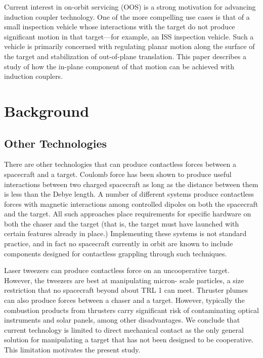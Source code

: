 \documentclass{article}
\begin{document}
Current interest in on-orbit servicing (OOS) is a strong motivation for advancing induction coupler technology. \cite{Ambrose2012}
 One of the more compelling use cases is that of a small inspection vehicle whose interactions with the target do not produce significant motion in that target—for example, an ISS inspection vehicle. Such a vehicle is primarily concerned with regulating planar motion along the surface of the target and stabilization of out-of-plane translation. This paper describes a study of how the in-plane component of that motion can be achieved with induction couplers.


\section{Background}
\subsection{Other Technologies}

There are other technologies that can produce contactless forces between a spacecraft and a target. Coulomb force has been shown to produce useful interactions between two charged spacecraft as long as the distance between them is less than the Debye length. \cite{coulombtether} A number of different systems produce contactless forces with magnetic interactions among controlled dipoles on both the spacecraft and the target.\cite{dipoleplanning} \cite{Kong2004}
All such approaches place requirements for specific hardware on both the chaser and the target (that is, the target must have launched with certain features already in place.) Implementing these systems is not standard practice, and in fact no spacecraft currently in orbit are known to include components designed for contactless grappling through such techniques.

Laser tweezers can produce contactless force on an uncooperative target. \cite{lasertweezers}However, the tweezers are best at manipulating micron- scale particles, a size restriction that no spacecraft beyond about TRL 1‎ can meet. \cite{lasermirrors} Thruster plumes can also produce forces between a chaser and a target. However, typically the combustion products from thrusters carry significant risk of contaminating optical instruments and solar panels, among other disadvantages. We conclude that current technology is limited to direct mechanical contact as the only general solution for manipulating a target that has not been designed to be cooperative.  This limitation motivates the present study.
\end{document}
